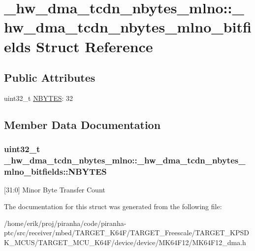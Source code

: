 \hypertarget{struct__hw__dma__tcdn__nbytes__mlno_1_1__hw__dma__tcdn__nbytes__mlno__bitfields}{}\section{\+\_\+hw\+\_\+dma\+\_\+tcdn\+\_\+nbytes\+\_\+mlno\+:\+:\+\_\+hw\+\_\+dma\+\_\+tcdn\+\_\+nbytes\+\_\+mlno\+\_\+bitfields Struct Reference}
\label{struct__hw__dma__tcdn__nbytes__mlno_1_1__hw__dma__tcdn__nbytes__mlno__bitfields}
\subsection*{Public Attributes}
\begin{DoxyCompactItemize}
\item 
uint32\+\_\+t \hyperlink{struct__hw__dma__tcdn__nbytes__mlno_1_1__hw__dma__tcdn__nbytes__mlno__bitfields_ae57d36ccaf45f8d1f6aba280aebe0cf3}{N\+B\+Y\+T\+ES}\+: 32
\end{DoxyCompactItemize}


\subsection{Member Data Documentation}
\subsubsection[{\texorpdfstring{N\+B\+Y\+T\+ES}{NBYTES}}]{\setlength{\rightskip}{0pt plus 5cm}uint32\+\_\+t \+\_\+hw\+\_\+dma\+\_\+tcdn\+\_\+nbytes\+\_\+mlno\+::\+\_\+hw\+\_\+dma\+\_\+tcdn\+\_\+nbytes\+\_\+mlno\+\_\+bitfields\+::\+N\+B\+Y\+T\+ES}\hypertarget{struct__hw__dma__tcdn__nbytes__mlno_1_1__hw__dma__tcdn__nbytes__mlno__bitfields_ae57d36ccaf45f8d1f6aba280aebe0cf3}{}\label{struct__hw__dma__tcdn__nbytes__mlno_1_1__hw__dma__tcdn__nbytes__mlno__bitfields_ae57d36ccaf45f8d1f6aba280aebe0cf3}
\mbox{[}31\+:0\mbox{]} Minor Byte Transfer Count 

The documentation for this struct was generated from the following file\+:\begin{DoxyCompactItemize}
\item 
/home/erik/proj/piranha/code/piranha-\/ptc/src/receiver/mbed/\+T\+A\+R\+G\+E\+T\+\_\+\+K64\+F/\+T\+A\+R\+G\+E\+T\+\_\+\+Freescale/\+T\+A\+R\+G\+E\+T\+\_\+\+K\+P\+S\+D\+K\+\_\+\+M\+C\+U\+S/\+T\+A\+R\+G\+E\+T\+\_\+\+M\+C\+U\+\_\+\+K64\+F/device/device/\+M\+K64\+F12/M\+K64\+F12\+\_\+dma.\+h\end{DoxyCompactItemize}
